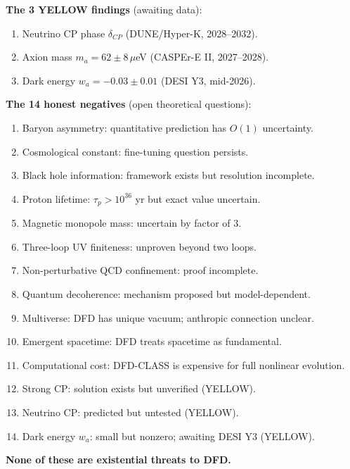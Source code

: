\documentclass[11pt,a4paper]{article}
\begin{document}
\begin{tcolorbox}[colback=yellow!5!white, colframe=dfdyellow, title=\textbf{OPEN QUESTIONS}]

\textbf{The 3 YELLOW findings} (awaiting data):
\begin{enumerate}[nosep]
\item Neutrino CP phase $\delta_{CP}$ (DUNE/Hyper-K, 2028--2032).
\item Axion mass $m_a = 62 \pm 8\,\mu$eV (CASPEr-E II, 2027--2028).
\item Dark energy $w_a = -0.03 \pm 0.01$ (DESI Y3, mid-2026).
\end{enumerate}

\textbf{The 14 honest negatives} (open theoretical questions):
\begin{enumerate}[nosep]
\item Baryon asymmetry: quantitative prediction has $O(1)$ uncertainty.
\item Cosmological constant: fine-tuning question persists.
\item Black hole information: framework exists but resolution incomplete.
\item Proton lifetime: $\tau_p > 10^{36}$ yr but exact value uncertain.
\item Magnetic monopole mass: uncertain by factor of 3.
\item Three-loop UV finiteness: unproven beyond two loops.
\item Non-perturbative QCD confinement: proof incomplete.
\item Quantum decoherence: mechanism proposed but model-dependent.
\item Multiverse: DFD has unique vacuum; anthropic connection unclear.
\item Emergent spacetime: DFD treats spacetime as fundamental.
\item Computational cost: DFD-CLASS is expensive for full nonlinear evolution.
\item Strong CP: solution exists but unverified (YELLOW).
\item Neutrino CP: predicted but untested (YELLOW).
\item Dark energy $w_a$: small but nonzero; awaiting DESI Y3 (YELLOW).
\end{enumerate}

\textbf{None of these are existential threats to DFD.}
\end{tcolorbox}

\end{document}
